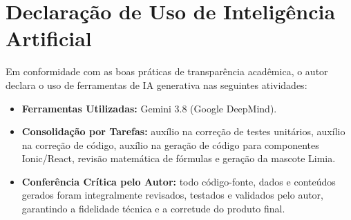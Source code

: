 \documentclass[12pt, a4paper]{article}
\begin{document}
\section{Declara\c{c}\~{a}o de Uso de Intelig\^{e}ncia Artificial}
Em conformidade com as boas pr\'{a}ticas de transpar\^{e}ncia acad\^{e}mica, o autor declara o uso de ferramentas de IA generativa nas seguintes atividades:
\begin{itemize}
    \item \textbf{Ferramentas Utilizadas:} Gemini 3.8 (Google DeepMind).
    \item \textbf{Consolida\c{c}\~{a}o por Tarefas:} aux\'{i}lio na corre\c{c}\~{a}o de testes unit\'{a}rios, aux\'{i}lio na corre\c{c}\~{a}o de c\'{o}digo, aux\'{i}lio na gera\c{c}\~{a}o de c\'{o}digo para componentes Ionic/React, revis\~{a}o matem\'{a}tica de f\'{o}rmulas e gera\c{c}\~{a}o da mascote Limia.
    \item \textbf{Confer\^{e}ncia Cr\'{i}tica pelo Autor:} todo c\'{o}digo-fonte, dados e conte\'{u}dos gerados foram integralmente revisados, testados e validados pelo autor, garantindo a fidelidade t\'{e}cnica e a corretude do produto final.
\end{itemize}
\end{document}

